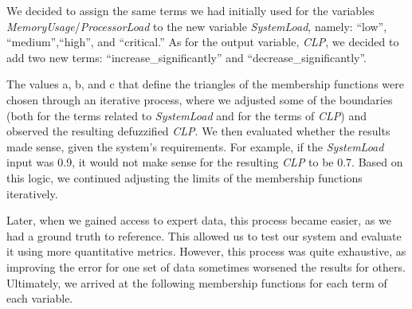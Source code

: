 \documentclass[titlepage]{article}
\begin{document}
We decided to assign the same terms we had initially used for the variables \textit{MemoryUsage}/\textit{ProcessorLoad} to the new variable \textit{SystemLoad}, namely: ``low'', ``medium'',``high'', and ``critical.'' As for the output variable, \textit{CLP}, we decided to add two new terms: ``increase\_significantly'' and ``decrease\_significantly''.

The values a, b, and c that define the triangles of the membership functions were chosen through an iterative process, where we adjusted some of the boundaries (both for the terms related to \textit{SystemLoad} and for the terms of \textit{CLP}) and observed the resulting defuzzified \textit{CLP}.
We then evaluated whether the results made sense, given the system's requirements. For example, if the \textit{SystemLoad} input was 0.9, it would not make sense for the resulting \textit{CLP} to be 0.7. Based on this logic, we continued adjusting the limits of the membership functions iteratively.

Later, when we gained access to expert data, this process became easier, as we had a ground truth to reference.
This allowed us to test our system and evaluate it using more quantitative metrics.
However, this process was quite exhaustive, as improving the error for one set of data sometimes worsened the results for others.
Ultimately, we arrived at the following membership functions for each term of each variable.
\end{document}
